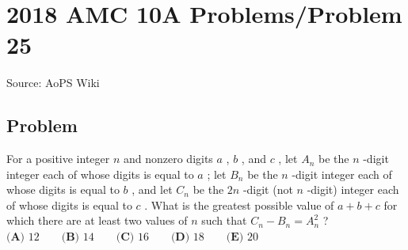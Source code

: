 \documentclass[12pt]{article}
\begin{document}
\section*{{2018 AMC 10A Problems/Problem 25}}
Source: AoPS Wiki

\subsection*{Problem}
For a positive integer $n$ and nonzero digits $a$ , $b$ , and $c$ , let $A_n$ be the $n$ -digit integer each of whose digits is equal to $a$ ; let $B_n$ be the $n$ -digit integer each of whose digits is equal to $b$ , and let $C_n$ be the $2n$ -digit (not $n$ -digit) integer each of whose digits is equal to $c$ . What is the greatest possible value of $a + b + c$ for which there are at least two values of $n$ such that $C_n - B_n = A_n^2$ ? $\textbf{(A) } 12 \qquad \textbf{(B) } 14 \qquad \textbf{(C) } 16 \qquad \textbf{(D) } 18 \qquad \textbf{(E) } 20$
\end{document}
